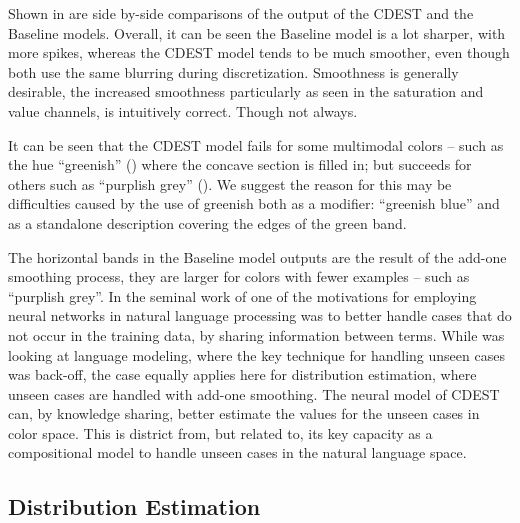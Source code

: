 \documentclass[11pt,letterpaper]{article}
\newcommand{\textcite}{\newcite}
\begin{document}


Shown in  are side by-side comparisons of the output of the CDEST and the Baseline models.
Overall, it can be seen the Baseline model is a lot sharper, with more spikes,
whereas the CDEST model tends to be much smoother, even though both use the same blurring during discretization.
Smoothness is generally desirable, the increased smoothness particularly as seen in the saturation and value channels, is intuitively correct.
Though not always.

It can be seen that the CDEST model fails for some multimodal colors -- such as the hue ``greenish'' () where the concave section is filled in;
but succeeds for others such as ``purplish grey'' ().
We suggest the reason for this may be difficulties caused by the use of greenish both as a modifier: ``greenish blue'' and as a standalone description covering the edges of the green band.

The horizontal bands in the Baseline model outputs are the result of the add-one smoothing process, they are larger for colors with fewer examples -- such as ``purplish grey''.
In the seminal work of \textcite{NPLM} one of the motivations for employing neural networks in natural language processing was to better handle cases that do not occur in the training data, by sharing information between terms.
While \textcite{NPLM} was looking at language modeling, where the key technique for handling unseen cases was back-off, the case equally applies here for distribution estimation, where unseen cases are handled with add-one smoothing.
The neural model of CDEST can, by knowledge sharing, better estimate the values for the unseen cases in color space.
This is district from, but related to, its key capacity as a compositional model to handle unseen cases in the natural language space.
 


\subsection{Distribution Estimation}
\end{document}
